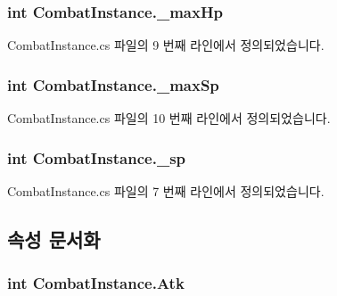 \subsubsection[{\texorpdfstring{\+\_\+max\+Hp}{_maxHp}}]{\setlength{\rightskip}{0pt plus 5cm}int Combat\+Instance.\+\_\+max\+Hp\hspace{0.3cm}{\ttfamily [private]}}\hypertarget{class_combat_instance_afce9395cdf3a359fb6eb982c0bf7f063}{}\label{class_combat_instance_afce9395cdf3a359fb6eb982c0bf7f063}


Combat\+Instance.\+cs 파일의 9 번째 라인에서 정의되었습니다.

\subsubsection[{\texorpdfstring{\+\_\+max\+Sp}{_maxSp}}]{\setlength{\rightskip}{0pt plus 5cm}int Combat\+Instance.\+\_\+max\+Sp\hspace{0.3cm}{\ttfamily [private]}}\hypertarget{class_combat_instance_a2489b1182b81f028cfd45f26fb2a7af0}{}\label{class_combat_instance_a2489b1182b81f028cfd45f26fb2a7af0}


Combat\+Instance.\+cs 파일의 10 번째 라인에서 정의되었습니다.

\subsubsection[{\texorpdfstring{\+\_\+sp}{_sp}}]{\setlength{\rightskip}{0pt plus 5cm}int Combat\+Instance.\+\_\+sp\hspace{0.3cm}{\ttfamily [private]}}\hypertarget{class_combat_instance_a3a9ee2ea52b19b5150386b52396621f9}{}\label{class_combat_instance_a3a9ee2ea52b19b5150386b52396621f9}


Combat\+Instance.\+cs 파일의 7 번째 라인에서 정의되었습니다.



\subsection{속성 문서화}
\subsubsection[{\texorpdfstring{Atk}{Atk}}]{\setlength{\rightskip}{0pt plus 5cm}int Combat\+Instance.\+Atk\hspace{0.3cm}{\ttfamily [get]}}\hypertarget{class_combat_instance_a9de7c50888b56d9854709d132e69baa9}{}\label{class_combat_instance_a9de7c50888b56d9854709d132e69baa9}


